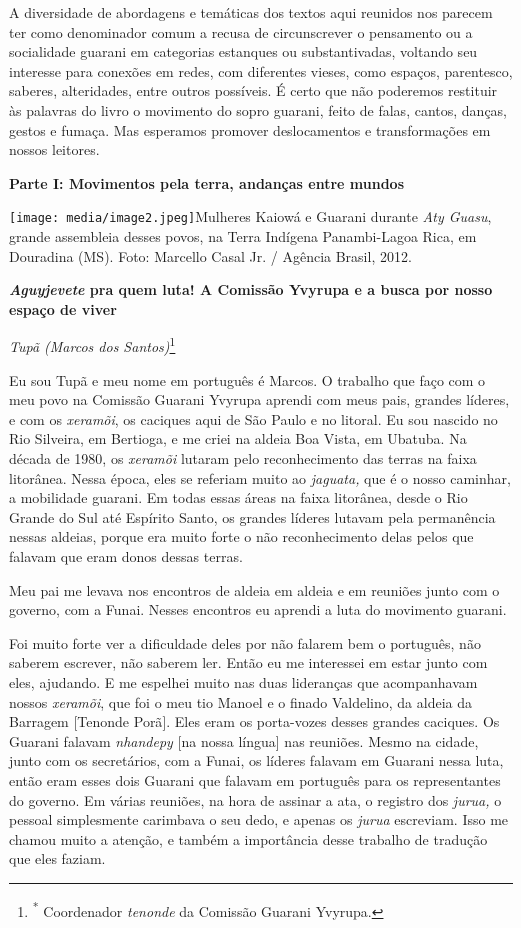 A diversidade de abordagens e temáticas dos textos aqui reunidos nos
parecem ter como denominador comum a recusa de circunscrever o
pensamento ou a socialidade guarani em categorias estanques ou
substantivadas, voltando seu interesse para conexões em redes, com
diferentes vieses, como espaços, parentesco, saberes, alteridades, entre
outros possíveis. É certo que não poderemos restituir às palavras do
livro o movimento do sopro guarani, feito de falas, cantos, danças,
gestos e fumaça. Mas esperamos promover deslocamentos e transformações
em nossos leitores.

\textbf{Parte I: Movimentos pela terra, andanças entre mundos}

\texttt{[image: media/image2.jpeg]}Mulheres
Kaiowá e Guarani durante \emph{Aty Guasu}, grande assembleia desses
povos, na Terra Indígena Panambi-Lagoa Rica, em Douradina (MS). Foto:
Marcello Casal Jr. / Agência Brasil, 2012.

\textbf{\emph{Aguyjevete} pra quem luta! A Comissão Yvyrupa e a busca
por nosso espaço de viver}

\emph{Tupã (Marcos dos Santos)}\footnote{\textsuperscript{*} Coordenador
  \emph{tenonde} da Comissão Guarani Yvyrupa.}

Eu sou Tupã e meu nome em português é Marcos. O trabalho que faço com o
meu povo na Comissão Guarani Yvyrupa aprendi com meus pais, grandes
líderes, e com os \emph{xeramõi}, os caciques aqui de São Paulo e no
litoral. Eu sou nascido no Rio Silveira, em Bertioga, e me criei na
aldeia Boa Vista, em Ubatuba. Na década de 1980, os \emph{xeramõi}
lutaram pelo reconhecimento das terras na faixa litorânea. Nessa época,
eles se referiam muito ao \emph{jaguata,} que é o nosso caminhar, a
mobilidade guarani. Em todas essas áreas na faixa litorânea, desde o Rio
Grande do Sul até Espírito Santo, os grandes líderes lutavam pela
permanência nessas aldeias, porque era muito forte o não reconhecimento
delas pelos que falavam que eram donos dessas terras.

Meu pai me levava nos encontros de aldeia em aldeia e em reuniões junto
com o governo, com a Funai. Nesses encontros eu aprendi a luta do
movimento guarani.

Foi muito forte ver a dificuldade deles por não falarem bem o português,
não saberem escrever, não saberem ler. Então eu me interessei em estar
junto com eles, ajudando. E me espelhei muito nas duas lideranças que
acompanhavam nossos \emph{xeramõi}, que foi o meu tio Manoel e o finado
Valdelino, da aldeia da Barragem {[}Tenonde Porã{]}. Eles eram os
porta-vozes desses grandes caciques. Os Guarani falavam \emph{nhandepy}
{[}na nossa língua{]} nas reuniões. Mesmo na cidade, junto com os
secretários, com a Funai, os líderes falavam em Guarani nessa luta,
então eram esses dois Guarani que falavam em português para os
representantes do governo. Em várias reuniões, na hora de assinar a ata,
o registro dos \emph{jurua,} o pessoal simplesmente carimbava o seu
dedo, e apenas os \emph{jurua} escreviam. Isso me chamou muito a
atenção, e também a importância desse trabalho de tradução que eles
faziam.

